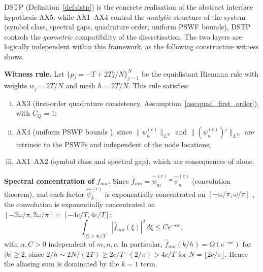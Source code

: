 
\begin{remark}
\label{rem:ax5_independence}
DSTP (Definition~\ref{def:dstp}) is the concrete realisation of the
abstract interface hypothesis \textup{AX5}: while \textup{AX1--AX4}
control the \emph{analytic} structure of the system (symbol class,
spectral gaps, quadrature order, uniform PSWF bounds), DSTP controls
the \emph{geometric} compatibility of the discretisation.
The two layers are logically independent within this framework,
as the following constructive witness shows.

\smallskip
\noindent\textbf{Witness rule.}
Let $\{p_j = -T + 2Tj/N\}_{j=1}^N$ be the equidistant Riemann rule
with weights $w_j = 2T/N$ and mesh $h = 2T/N$.
This rule satisfies:
\begin{enumerate}[(i)]
\item \textup{AX3} (first-order quadrature consistency,
  Assumption~\ref{ass:quad_first_order}), with $C_Q = 1$;
\item \textup{AX4} (uniform PSWF bounds \cite{BonamiKaroui2014}),
  since $\|\psi_n^{(c)}\|_{L^\infty}$ and
  $\|(\psi_n^{(c)})'\|_{L^\infty}$ are intrinsic to the PSWFs and
  independent of the node locations;
\item \textup{AX1--AX2} (symbol class and spectral gap), which are
  consequences of \cite{PaperIV,OsipovRokhlinXiao} alone.
\end{enumerate}

\smallskip
\noindent\textbf{Spectral concentration of $f_{mn}$.}
Since $\hat{f}_{mn} = \hat{\psi}_m^{(c)} \ast \hat{\psi}_n^{(c)}$
(convolution theorem), and each factor $\hat{\psi}_k^{(c)}$ is
exponentially concentrated on $[-\omega/\pi, \omega/\pi]$
\cite{BonamiKaroui}, the convolution is exponentially concentrated
on $[-2\omega/\pi, 2\omega/\pi] = [-4c/T, 4c/T]$:
\[
  \int_{|\xi| > 4c/T} |\hat{f}_{mn}(\xi)|^2\,d\xi \le C e^{-\alpha c},
\]
with $\alpha, C > 0$ independent of $m, n, c$.
In particular, $\hat{f}_{mn}(k/h) = O(e^{-\alpha c})$ for $|k| \ge 2$,
since $2/h \sim 2N/(2T) \ge 2c/T \cdot (2/\pi) > 4c/T$ for
$N = \lfloor 2c/\pi\rfloor$.
Hence the aliasing sum is dominated by the $k = 1$ term.


\end{remark}
